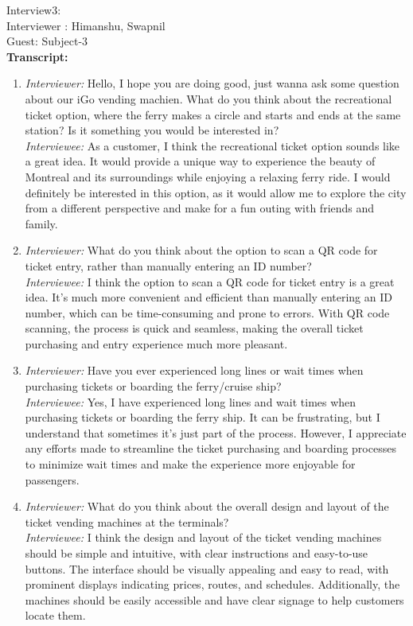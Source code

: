Interview3:\\
Interviewer : Himanshu, Swapnil \\
Guest: Subject-3\\
\textbf{Transcript:}
\begin{enumerate}
\item \emph{Interviewer:} Hello, I hope you are doing good, just wanna ask some question about our iGo vending machien. What do you think about the recreational ticket option, where the ferry makes a circle and starts and ends at the same station? Is it something you would be interested in?\\
\emph{Interviewee:} As a customer, I think the recreational ticket option sounds like a great idea. It would provide a unique way to experience the beauty of Montreal and its surroundings while enjoying a relaxing ferry ride. I would definitely be interested in this option, as it would allow me to explore the city from a different perspective and make for a fun outing with friends and family.
\item \emph{Interviewer:} What do you think about the option to scan a QR code for ticket entry, rather than manually entering an ID number?\\
\emph{Interviewee:} I think the option to scan a QR code for ticket entry is a great idea. It's much more convenient and efficient than manually entering an ID number, which can be time-consuming and prone to errors. With QR code scanning, the process is quick and seamless, making the overall ticket purchasing and entry experience much more pleasant.
\item \emph{Interviewer:} Have you ever experienced long lines or wait times when purchasing tickets or boarding the ferry/cruise ship?\\
\emph{Interviewee:} Yes, I have experienced long lines and wait times when purchasing tickets or boarding the ferry ship. It can be frustrating, but I understand that sometimes it's just part of the process. However, I appreciate any efforts made to streamline the ticket purchasing and boarding processes to minimize wait times and make the experience more enjoyable for passengers.
\item \emph{Interviewer:} What do you think about the overall design and layout of the ticket vending machines at the terminals?\\
\emph{Interviewee:}  I think the design and layout of the ticket vending machines should be simple and intuitive, with clear instructions and easy-to-use buttons. The interface should be visually appealing and easy to read, with prominent displays indicating prices, routes, and schedules. Additionally, the machines should be easily accessible and have clear signage to help customers locate them.

\end{enumerate}
